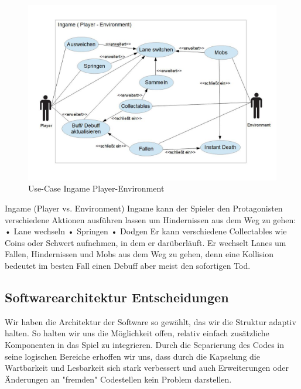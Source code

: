 \documentclass{article}
\begin{document}

\begin{figure}
	\centering
	\includegraphics[width=1\textwidth]{UCIPE}
	\caption{Use-Case Ingame Player-Environment
		\label{fig:UCIPE}}
\end{figure}

\noindent Ingame (Player vs. Environment)\newline
Ingame kann der Spieler den Protagonisten verschiedene Aktionen ausführen lassen um
Hindernissen aus dem Weg zu gehen:\newline
• Lane wechseln\newline
• Springen\newline
• Dodgen\newline
Er kann verschiedene Collectables wie Coins oder Schwert aufnehmen, in dem er darüberläuft.
Er wechselt Lanes um Fallen, Hindernissen und Mobs aus dem Weg zu gehen, denn eine Kollision
bedeutet im besten Fall einen Debuff aber meist den sofortigen Tod. \newline


\subsection{Softwarearchitektur Entscheidungen}


Wir haben die Architektur der Software so gewählt, das wir die Struktur adaptiv halten. So halten wir uns die Möglichkeit offen, relativ einfach zusätzliche Komponenten in das Spiel zu integrieren.
Durch die Separierung des Codes in seine logischen Bereiche erhoffen wir uns, dass durch die Kapselung die Wartbarkeit und Lesbarkeit sich stark verbessert und auch Erweiterungen oder Änderungen an "fremden" Codestellen kein Problem darstellen.
\newline
\end{document}
